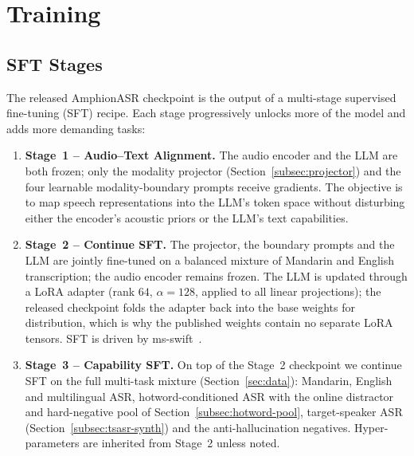\section{Training}
\label{sec:training}

\subsection{SFT Stages}

The released AmphionASR checkpoint is the output of a multi-stage
supervised fine-tuning (SFT) recipe. Each stage progressively
unlocks more of the model and adds more demanding tasks:

\begin{enumerate}
  \item \textbf{Stage~1 -- Audio--Text Alignment.}
        The audio encoder and the LLM are both frozen; only the
        modality projector (Section~\ref{subsec:projector}) and the
        four learnable modality-boundary prompts receive gradients. The
        objective is to map speech representations into the LLM's
        token space without disturbing either the encoder's acoustic
        priors or the LLM's text capabilities.
  \item \textbf{Stage~2 -- Continue SFT.} The projector, the
        boundary prompts and the LLM are jointly fine-tuned on a
        balanced mixture of Mandarin and English transcription; the
        audio encoder remains frozen. The LLM is updated through a
        LoRA adapter (rank $64$, $\alpha=128$, applied to all linear
        projections); the released checkpoint folds the adapter back
        into the base weights for distribution, which is why the
        published weights contain no separate LoRA tensors. SFT is
        driven by ms-swift~\cite{msswift}.
  \item \textbf{Stage~3 -- Capability SFT.} On top of the Stage~2
        checkpoint we continue SFT on the full multi-task mixture
        (Section~\ref{sec:data}): Mandarin, English and multilingual
        ASR, hotword-conditioned ASR with the online distractor and
        hard-negative pool of Section~\ref{subsec:hotword-pool},
        target-speaker ASR (Section~\ref{subsec:tsasr-synth}) and the
        anti-hallucination negatives. Hyper-parameters are inherited
        from Stage~2 unless noted.
\end{enumerate}

